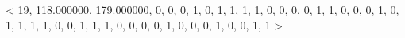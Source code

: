 < 19, 118.000000, 179.000000, 0, 0, 0, 1, 0, 1, 1, 1, 1, 0, 0, 0, 0, 1, 1, 0, 0, 0, 1, 0, 1, 1, 1, 1, 0, 0, 1, 1, 1, 0, 0, 0, 0, 1, 0, 0, 0, 1, 0, 0, 1, 1 > 


